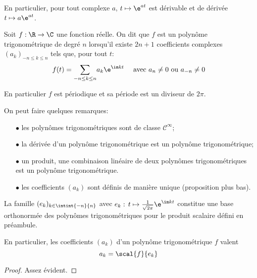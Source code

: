 En particulier, pour tout complexe $a$, $t \mapsto \e^{at}$ est dérivable et de dérivée $t \mapsto a \e^{at}$.

\begin{de}
Soit $f: \R \to \C$ une fonction réelle. On dit que $f$ est un polynôme trigonométrique de degré $n$ lorsqu'il existe $2n+1$ coefficients complexes $(a_k)_{-n \leq k \leq n}$ tels que, pour tout $t$:
\[
f(t) = \displaystyle{\sum \limits_{-n \leq k \leq n}} a_k \e^{\im k t} \quad \text{ avec } a_n \neq 0 \text{ ou }a_{-n} \neq 0
\]

En particulier $f$ est périodique et sa période est un diviseur de $2\pi$.
\end{de}

On peut faire quelques remarques:
\begin{itemize}
\item[$\bullet$]
les polynômes trigonométriques sont de classe $\mathcal{C}^{\infty}$;
\item[$\bullet$]
la dérivée d'un polynôme trigonométrique est un polynôme trigonométrique;
\item[$\bullet$]
un produit, une combinaison linéaire de deux polynômes trigonométriques est un polynôme trigonométrique.
\item[$\bullet$]
les coefficients $(a_k)$ sont définis de manière unique (proposition plus bas).
\end{itemize}

\begin{prop}
La famille  $(e_k)_{k \in \intint{-n}{n}}$ avec $e_k: \, t \mapsto \frac{1}{\sqrt{2\pi}} \e^{\im k t}$ constitue une base orthonormée des polynômes trigonométriques pour le produit scalaire défini en préambule.

En particulier, les coefficients $(a_k)$ d'un polynôme trigonométrique $f$ valent
\[
a_k = \scal{f}{e_k}
\]
\end{prop}

\begin{proof}
Assez évident.
\end{proof}

